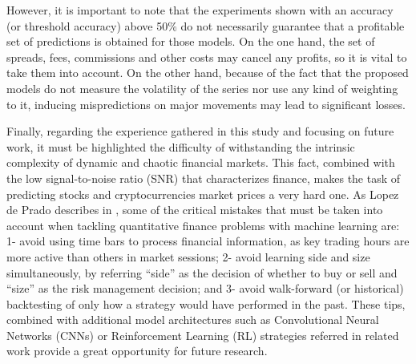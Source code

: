 \documentclass[10pt,twocolumn,letterpaper]{article}
\begin{document}
However, it is important to note that the experiments shown with an accuracy (or threshold accuracy) above 50\% do not necessarily guarantee that a profitable set of predictions is obtained for those models. On the one hand, the set of spreads, fees, commissions and other costs may cancel any profits, so it is vital to take them into account. On the other hand, because of the fact that the proposed models do not measure the volatility of the series nor use any kind of weighting to it, inducing mispredictions on major movements may lead to significant losses.

Finally, regarding the experience gathered in this study and focusing on future work, it must be highlighted the difficulty of withstanding the intrinsic complexity of dynamic and chaotic financial markets. This fact, combined with the low signal-to-noise ratio (SNR) that characterizes finance, makes the task of predicting stocks and cryptocurrencies market prices a very hard one. As Lopez de Prado describes in \cite{Prado}, some of the critical mistakes that must be taken into account when tackling quantitative finance problems with machine learning are: 1- avoid using time bars to process financial information, as key trading hours are more active than others in market sessions; 2- avoid learning side and size simultaneously, by referring “side” as the decision of whether to buy or sell and “size” as the risk management decision; and 3- avoid walk-forward (or historical) backtesting of only how a strategy would have performed in the past. These tips, combined with additional model architectures such as Convolutional Neural Networks (CNNs) or Reinforcement Learning (RL) strategies referred in related work provide a great opportunity for future research.

\newpage

{\small


}
\end{document}
